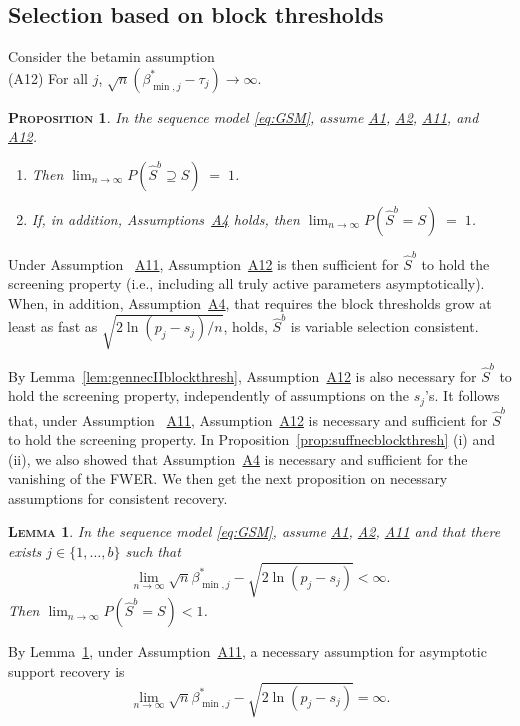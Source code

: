 \documentclass[bj,authoryear]{imsart}
\theoremstyle{plain}
\newtheorem{prop}[thm]{\textsc{Proposition}}
\newtheorem{lem}[thm]{\textsc{Lemma}}
\begin{document}
\subsection{Selection based on block thresholds}

Consider the betamin assumption\\[5pt]
\hypertarget{lab:A12}{(A12)} \quad For all $j$, \; $\sqrt{n}(\beta_{\min,j}^*-\tau_j) \to \infty$.
\begin{prop}\label{prop:suffnecIIblockthreshbis}
 In the sequence model \eqref{eq:GSM}, assume \hyperlink{lab:A1}{A1}, \hyperlink{lab:A2}{A2}, \hyperlink{lab:A11}{A11}, and \hyperlink{lab:A12}{A12}.
 \begin{enumerate}[label=(\roman*)]
  \item Then $\lim_{n\to\infty}P(\hat{S}^{b}\supseteq S ) \;=\; 1$.
  \item If, in addition, Assumptions~\hyperlink{lab:A4}{A4} holds, then  $\lim_{n\to\infty}P(\hat{S}^{b}=S  ) \;=\; 1$.
 \end{enumerate}
\end{prop}
Under Assumption ~\hyperlink{lab:A11}{A11}, Assumption~\hyperlink{lab:A12}{A12} is then sufficient for $\hat{S}^{b}$ to hold the screening property (i.e., including all truly active parameters asymptotically). When, in addition, Assumption~\hyperlink{lab:A4}{A4}, that requires the block thresholds grow at least as fast as $\sqrt{2\ln(p_j-s_j)/n}$, holds, $\hat{S}^{b}$ is variable selection consistent.

By Lemma~\ref{lem:gennecIIblockthresh}, Assumption~\hyperlink{lab:A12}{A12} is also necessary for $\hat{S}^{b}$ to hold the screening property, independently of assumptions on the $s_j$'s. It follows that, under Assumption ~\hyperlink{lab:A11}{A11}, Assumption~\hyperlink{lab:A12}{A12} is  necessary and sufficient for $\hat{S}^{b}$ to hold the screening property. In Proposition~\ref{prop:suffnecblockthresh} (i) and (ii), we also showed that Assumption~\hyperlink{lab:A4}{A4} is necessary and sufficient for the vanishing of the FWER. We then get the next proposition on necessary assumptions for consistent recovery.

\begin{lem}\label{lem:necbetaminblockthresh2}
    In the sequence model \eqref{eq:GSM}, assume \hyperlink{lab:A1}{A1}, \hyperlink{lab:A2}{A2}, \hyperlink{lab:A11}{A11} and that there exists $j\in\{1,\ldots,b\}$ such that
\begin{equation}\label{eq:necbetaminblockthreshbis}
      \lim_{n\to \infty}\sqrt{n}\beta_{\min,j}^*-\sqrt{2\ln(p_j-s_j)} < \infty . 
    \end{equation}
Then $\lim_{n \to \infty} P(\hat{S}^{b} = S) < 1$.
\end{lem}
By Lemma~\ref{lem:necbetaminblockthresh2}, under Assumption~\hyperlink{lab:A11}{A11}, a necessary assumption for asymptotic support recovery is
\begin{equation}\label{eq:nectypeIIGSMfinite}
\lim_{n \to \infty} \sqrt{n}\beta_{\min,j}^*-\sqrt{2\ln(p_j-s_j)} = \infty.
\end{equation}
\end{document}
